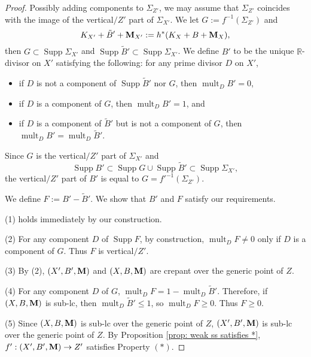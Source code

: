 \documentclass[11pt]{amsart}
\numberwithin{equation}{section}
\newcommand{\Mm}{{\bf{M}}}
\newcommand{\Rr}{\mathbb{R}}
\newcommand{\Supp}{\operatorname{Supp}}
\newcommand{\mult}{\operatorname{mult}}
\theoremstyle{definition}
\theoremstyle{definition}
\theoremstyle{definition}
\begin{document}
\begin{proof} 
Possibly adding components to $\Sigma_{Z'}$, we may assume that $\Sigma_{Z'}$ coincides with the image of the vertical$/Z'$ part of $\Sigma_{X'}$. We let $G:=f^{-1}(\Sigma_{Z'})$ and
$$K_{X'}+\tilde B'+\Mm_{X'}:=h^*(K_X+B+\Mm_X),$$
then $G\subset\Supp\Sigma_{X'}$ and $\Supp\tilde B'\subset\Supp\Sigma_{X'}$. We define $B'$ to be the unique $\Rr$-divisor on $X'$ satisfying the following: for any prime divisor $D$ on $X'$,
\begin{itemize}
\item if $D$ is not a component of $\Supp\tilde B'$ nor $G$, then $\mult_DB'=0$,
\item if $D$ is a component of $G$, then $\mult_DB'=1$, and
\item if $D$ is a component of $\tilde B'$ but is not a component of $G$, then $\mult_DB'=\mult_D\tilde B'$.
\end{itemize}
Since $G$ is the vertical$/Z'$ part of $\Sigma_{X'}$ and
$$\Supp B'\subset\Supp G\cup\Supp\tilde B'\subset\Supp\Sigma_{X'},$$
the vertical$/Z'$ part of $B'$ is equal to $G=f'^{-1}(\Sigma_{Z'})$. 

We define $F:=B'-\tilde B'$. We show that $B'$ and $F$ satisfy our requirements.

(1) holds immediately by our construction. 

(2) For any component $D$ of $\Supp F$, by construction, $\mult_DF\not=0$ only if $D$ is a component of $G$. Thus $F$ is vertical$/Z'$.

(3) By (2), $(X',B',\Mm)$ and $(X,B,\Mm)$ are crepant over the generic point of $Z$.

(4) For any component $D$ of $G$, $\mult_DF=1-\mult_D\tilde B'$. Therefore, if $(X,B,\Mm)$ is sub-lc, then $\mult_D\tilde B'\leq 1$, so $\mult_DF\geq 0$. Thus $F\geq 0$.

(5) Since $(X,B,\Mm)$ is sub-lc over the generic point of $Z$, $(X',B',\Mm)$ is sub-lc over the generic point of $Z$. By Proposition \ref{prop: weak ss satisfies *}, $f': (X',B',\Mm)\rightarrow Z'$ satisfies Property $(*)$.
\end{proof}
\end{document}
